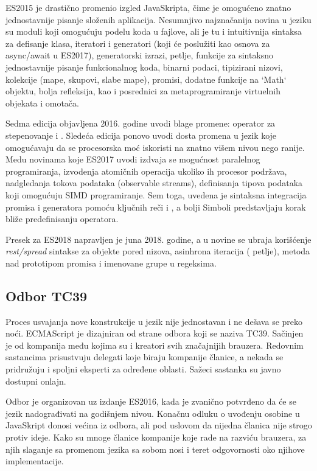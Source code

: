 ES2015 je drastično promenio izgled JavaSkripta, čime je omogućeno znatno jednostavnije pisanje složenih aplikacija.
Nesumnjivo najznačanija novina u jeziku su moduli koji omogućuju podelu koda u fajlove, ali je tu i intuitivnija sintaksa za defisanje klasa, iteratori i generatori (koji će poslužiti kao osnova za async/await u ES2017), generatorski izrazi,  petlje,  funkcije za sintaksno jednostavnije pisanje funkcionalnog koda, binarni podaci, tipizirani nizovi, kolekcije (mape, skupovi, slabe mape), promisi, dodatne funkcije na `Math` objektu, bolja refleksija, kao i posrednici za metaprogramiranje virtuelnih objekata i omotača.

Sedma edicija objavljena 2016. godine uvodi blage promene: operator za stepenovanje \code{**} i . Sledeća edicija ponovo uvodi dosta promena u jezik koje omogućavaju da se procesorska moć iskoristi na znatno višem nivou nego ranije. Medu novinama koje ES2017 uvodi izdvaja se mogućnost paralelnog programiranja, izvodenja atomičnih operacija ukoliko ih procesor podržava, nadgledanja tokova podataka (observable streams), definisanja tipova podataka koji omogućuju SIMD programiranje. Sem toga, uvedena je sintaksna integracija promisa i generatora pomoću ključnih reči  i , a bolji Simboli predstavljaju korak bliže predefinisanju operatora.

Presek za ES2018 napravljen je juna 2018. godine, a u novine se ubraja korišćenje \textsl{rest/spread} sintakse za objekte pored nizova, asinhrona iteracija ( petlje), metoda  nad prototipom promisa i imenovane grupe u regeksima.

\subsection{Odbor TC39}

Proces usvajanja nove konstrukcije u jezik nije jednostavan i ne dešava se preko noći.
ECMAScript je dizajniran od strane odbora koji se naziva TC39.
Sačinjen je od kompanija među kojima su i kreatori svih značajnijih brauzera.
Redovnim sastancima prisustvuju delegati koje biraju kompanije članice, a nekada se pridružuju i spoljni eksperti za određene oblasti.
Sažeci sastanka su javno dostupni onlajn.

Odbor je organizovan uz izdanje ES2016, kada je zvanično potvrđeno da će se jezik nadograđivati na godišnjem nivou.
Konačnu odluku o uvođenju osobine u JavaSkript donosi većina iz odbora, ali pod uslovom da nijedna članica nije strogo protiv ideje.
Kako su mnoge članice kompanije koje rade na razviću brauzera, za njih slaganje sa promenom jezika sa sobom nosi i teret odgovornosti oko njihove implementacije.

